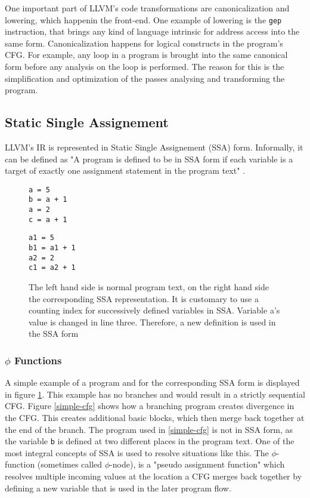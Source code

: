 One important part of LLVM's code transformations are canonicalization and lowering, which happenin the front-end. One example of lowering is the \verb|gep| instruction, that brings any kind of language intrinsic for address access into the same form. Canonicalization happens for logical constructs in the program's CFG. For example, any loop in a program is brought into the same canonical form before any analysis on the loop is performed.
The reason for this is the simplification and optimization of the passes analysing and transforming the program. 
\cite{llvm-passes}
\subsection{Static Single Assignement}
LLVM's IR is represented in Static Single Assignement (SSA) form. Informally, it can be defined as
"A program is defined to be in SSA form if each variable is a target of exactly one assignment
statement in the program text" \cite[p. 6]{Rastello:2016:SCD:3002539}.
\begin{figure}[t]
	\begin{minipage}{0.43\textwidth}	
\begin{lstlisting}[style=c]
a = 5
b = a + 1
a = 2
c = a + 1
\end{lstlisting}
	\end{minipage}\hfill
	\begin{minipage}{0.5\textwidth}
\begin{lstlisting}[style=c]
a1 = 5
b1 = a1 + 1
a2 = 2
c1 = a2 + 1
\end{lstlisting}
	\end{minipage}\hfill
	\caption{The left hand side is normal program text, on the right hand side the corresponding SSA representation. It is customary to use a counting index for successively defined variables in SSA. Variable a's value is changed in line three. Therefore, a new definition is used in the SSA form}
	\label{simpleSSA}
\end{figure}
\subsubsection{$\phi$ Functions}
A simple example of a program and for the corresponding SSA form  is displayed in figure \ref{simpleSSA}.
This example has no branches and would result in a strictly sequential CFG.
Figure \ref{simple-cfg} shows how a branching program creates divergence in the CFG. This creates additional basic blocks,
which then merge back together at the end of the branch. The program used in \ref{simple-cfg} is not in SSA form, as the variable \verb|b| is defined at two different places in the program text. One of the most integral concepts of SSA is used to resolve situations like this.
The $\phi$-function (sometimes called $\phi$-node), is a "pseudo assignment function"\cite{ssabook} which resolves multiple incoming values
at the location a CFG merges back together by defining a new variable that is used in the later program flow.
\cite{Rastello:2016:SCD:3002539}

